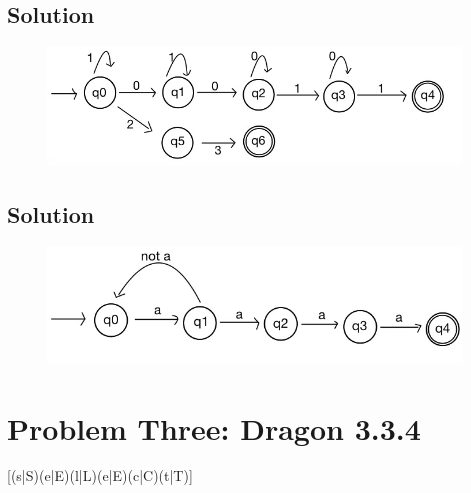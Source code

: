 \documentclass[letterpaper, 10pt,DIV=13]{scrartcl}
\numberwithin{equation}{section} %
\numberwithin{figure}{section} %
\numberwithin{table}{section} %
\begin{document}
\newpage
\subsection{Solution}

\begin{figure}[ht]
  \centering
  \includegraphics[width=11cm]{IMG_0042.png}
  \label{figure:dfa1.png}
\end{figure}

\newpage
\subsection{Solution}

\begin{figure}[ht]
  \centering
  \includegraphics[width=11cm]{IMG_0043.png}
  \label{figure:dfa1.png}
\end{figure}

\section{Problem Three: Dragon 3.3.4}

[(s|S)(e|E)(l|L)(e|E)(c|C)(t|T)]




 

\pagebreak
\end{document}
